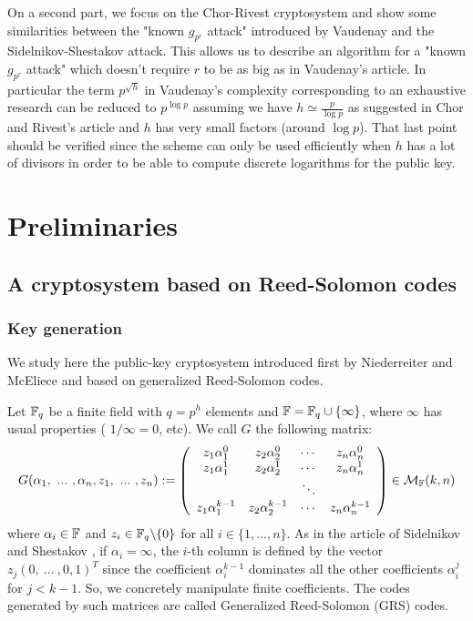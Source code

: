 \documentclass[a4paper]{article}
\begin{document}
On a second part, we focus on the Chor-Rivest cryptosystem and show some similarities between the "known $g_{p^r}$ attack" introduced by Vaudenay and the Sidelnikov-Shestakov attack. This allows us to describe an algorithm for a "known $g_{p^r}$ attack" which doesn't require $r$ to be as big as in Vaudenay's article. In particular the term $p^{\sqrt{h}}$ in Vaudenay's complexity corresponding to an exhaustive research can be reduced to $p^{\log p}$ assuming we have $h \simeq \frac{p}{\log p}$ as suggested in Chor and Rivest's article and $h$ has very small factors (around $\log p$). That last point should be verified since the scheme can only be used efficiently when $h$ has a lot of divisors in order to be able to compute discrete logarithms for the public key.



\newpage
\section{Preliminaries}
\label{sec:Prel}


\subsection{A cryptosystem based on Reed-Solomon codes}
\subsubsection{Key generation}

We study here the public-key cryptosystem introduced first by Niederreiter and McEliece \cite{NiederH86} and based on generalized Reed-Solomon codes.

Let $\mathbb{F}_q$ be a finite field with $q = p^h$ elements and $\mathbb{F} = \mathbb{F}_q \cup \{ \infty \}$, where $\infty$ has usual properties ( $1/\infty = 0$, etc). We call $G$ the following matrix:
$$ G(\alpha_1, \ ... \ , \alpha_n, z_1, \ ... \ , z_n) := \left(
\begin{array}{cccc}
z_1 \alpha_1^0 &  z_2 \alpha_2^0 & \cdots & z_n \alpha_n^0 \\
z_1 \alpha_1^1 &  z_2 \alpha_2^1 & \cdots & z_n \alpha_n^1 \\
 & & \ddots & \\
z_1 \alpha_1^{k-1} &  z_2 \alpha_2^{k-1} & \cdots & z_n \alpha_n^{k-1}
\end{array}
\right) \in \mathcal{M}_{\mathbb{F}}(k,n) $$
where $\alpha_i \in \mathbb{F}$ and $z_i \in \mathbb{F}_q\backslash\{0\}$ for all $i \in \{1,...,n\}$.
As in the article of Sidelnikov and Shestakov \cite{SidelShes92}, if $\alpha_i=\infty$, the $i$-th column is defined by the vector $z_j(0, \ ... \ , 0,1)^{T}$ since the coefficient $\alpha_i^{k-1}$ dominates all the other coefficients $\alpha_i^{j}$ for $j<k-1$.
So, we concretely manipulate finite coefficients. The codes generated by such matrices are called Generalized Reed-Solomon (GRS) codes.
\end{document}
